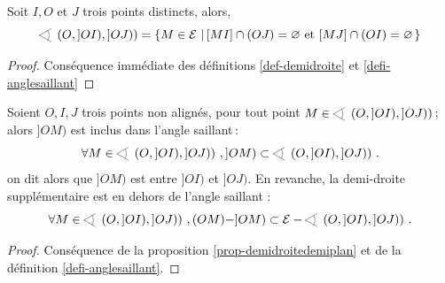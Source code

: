 \begin{prop}\label{prop-anglesaillantensemble}
    Soit $I, O$ et $J$ trois points distincts, alors,
    \begin{equation*}
        \anglesaillant\left({O},{]OI)},{]OJ)}\right) = \ensemble{M\in\mathcal{E}}{[MI]\cap (OJ)=\varnothing \text{ et }[MJ]\cap (OI)=\varnothing} 
    \end{equation*}
    \begin{proof}
        Conséquence immédiate des définitions \ref{def-demidroite} et \ref{defi-anglesaillant}
    \end{proof}
\end{prop}
\begin{prop}\label{prop-demidroitsecteurangle}
    Soient $O,I,J$ trois points non alignés, pour tout point $M \in \anglesaillant\left({O},{]OI)},{]OJ)}\right)$\,;  alors $]OM)$ est inclus dans l'angle saillant\,:
    \begin{equation*}
        \forall M \in \anglesaillant\left({O},{]OI)},{]OJ)}\right)\,, ]OM) \subset \anglesaillant\left({O},{]OI)},{]OJ)}\right) \,.
    \end{equation*}
    on dit alors que $]OM)$ est entre $]OI)$ et $]OJ)$. En revanche, la demi-droite supplémentaire est en dehors de l'angle saillant :
    \begin{equation*}
        \forall M \in \anglesaillant\left({O},{]OI)},{]OJ)}\right)\,, (OM)-]OM) \subset \mathcal{E}-\anglesaillant\left({O},{]OI)},{]OJ)}\right) \,.
    \end{equation*}
\begin{proof}
    Conséquence de la proposition \ref{prop-demidroitedemiplan} et de la définition \ref{defi-anglesaillant}. 
\end{proof}
\end{prop}
